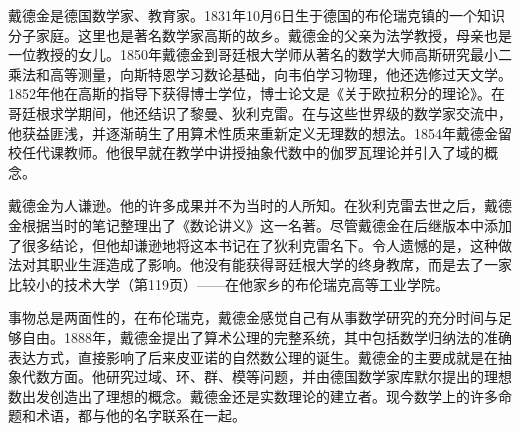 \documentclass[b5paper]{ctexart}
\begin{document}
\begin{mdframed}
戴德金是德国数学家、教育家。1831年10月6日生于德国的布伦瑞克镇的一个知识分子家庭。这里也是著名数学家高斯的故乡。戴德金的父亲为法学教授，母亲也是一位教授的女儿。1850年戴德金到哥廷根大学师从著名的数学大师高斯研究最小二乘法和高等测量，向斯特恩学习数论基础，向韦伯学习物理，他还选修过天文学。1852年他在高斯的指导下获得博士学位，博士论文是《关于欧拉积分的理论》。在哥廷根求学期间，他还结识了黎曼、狄利克雷。在与这些世界级的数学家交流中，他获益匪浅，并逐渐萌生了用算术性质来重新定义无理数的想法。1854年戴德金留校任代课教师。他很早就在教学中讲授抽象代数中的伽罗瓦理论并引入了域的概念。

戴德金为人谦逊。他的许多成果并不为当时的人所知。在狄利克雷去世之后，戴德金根据当时的笔记整理出了《数论讲义》这一名著。尽管戴德金在后继版本中添加了很多结论，但他却谦逊地将这本书记在了狄利克雷名下。令人遗憾的是，这种做法对其职业生涯造成了影响。他没有能获得哥廷根大学的终身教席，而是去了一家比较小的技术大学（\cite{StepanovRose15}第119页）——在他家乡的布伦瑞克高等工业学院。

事物总是两面性的，在布伦瑞克，戴德金感觉自己有从事数学研究的充分时间与足够自由。1888年，戴德金提出了算术公理的完整系统，其中包括数学归纳法的准确表达方式\cite{Dedekind-1858}，直接影响了后来皮亚诺的自然数公理的诞生。戴德金的主要成就是在抽象代数方面。他研究过域、环、群、模等问题，并由德国数学家库默尔提出的理想数出发创造出了理想的概念。戴德金还是实数理论的建立者。现今数学上的许多命题和术语，都与他的名字联系在一起。

\end{mdframed}
\end{document}
